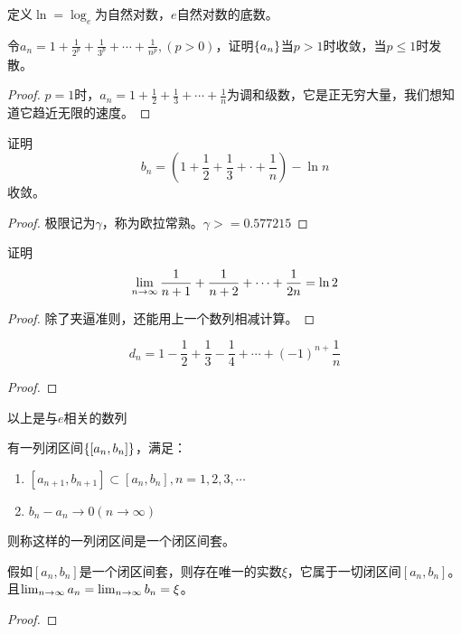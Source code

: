 定义$\ln = \log_e$为自然对数，$e$自然对数的底数。

\begin{proposition}
    令$a_n = 1 + \frac{1}{2^p} + \frac{1}{3^p} + \cdots + \frac{1}{n^p}, (p > 0)$，证明$\left\{ a_n\right\}$当$p>1$时收敛，当$p \le 1$时发散。    
\end{proposition}
\begin{proof}

$p = 1$时，$a_n = 1 + \frac{1}{2} +\frac{1}{3} + \cdots + \frac{1}{n}$为调和级数，它是正无穷大量，我们想知道它趋近无限的速度。
\end{proof}

\begin{proposition}
证明
    \[ b_n = \left( 1 +\frac{1}{2} + \frac{1}{3} + \cdot + \frac{1}{n} \right) - \ln n \]
    收敛。
\end{proposition}
\begin{proof}
    极限记为$\gamma$，称为欧拉常熟。$\gamma >= 0.577215$
\end{proof}

\begin{proposition}
证明
\[ \lim_{n \to \infty } \frac{1}{n+1} + \frac{1}{n+2} + \cdots + \frac{1}{2n} = \ln 2\]
\end{proposition}
\begin{proof}
除了夹逼准则，还能用上一个数列相减计算。
\end{proof}

\begin{proposition}
\[ d_n = 1- \frac{1}{2} + \frac{1}{3} - \frac{1}{4} + \cdots +(-1)^{n+}\frac{1}{n} \]
\end{proposition}
\begin{proof}

\end{proof}
以上是与$e$相关的数列

\begin{definition}[闭区间套]
    有一列闭区间$\left\{ \left[a_n, b_n \right]\right\}$，满足：
    \begin{enumerate}
        \item $\left[ a_{n+1}, b_{n+1}\right] \subset \left[ a_n, b_n\right], n = 1, 2, 3, \cdots $
        \item $b_n - a_n \to 0(n \to \infty)$
    \end{enumerate}
    则称这样的一列闭区间是一个闭区间套。
\end{definition}
\begin{theorem}[闭区间套定理]
    假如$\left[ a_n, b_n\right]$是一个闭区间套，则存在唯一的实数$\xi$，它属于一切闭区间$\left[ a_n, b_n\right]$。且$\lim_{n \to \infty } a_n = \lim_{n \to \infty } b_n = \xi$。
\end{theorem}
\begin{proof}
\end{proof}


